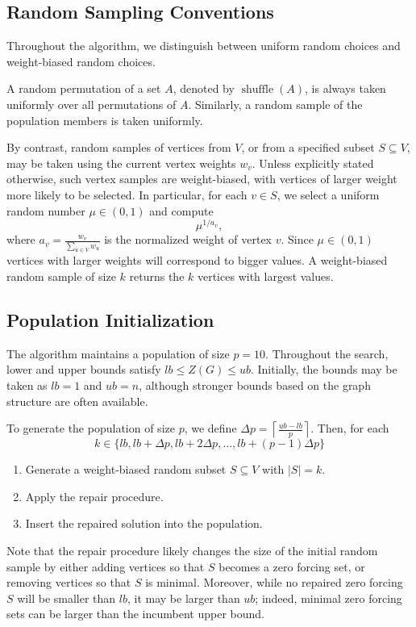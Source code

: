 \documentclass[11pt]{article}
\newcommand\ceil[1]{\left\lceil #1\right\rceil}
\newcommand\shuffle[1]{\operatorname{shuffle}\left(#1\right)}
\begin{document}
\subsection{Random Sampling Conventions}
Throughout the algorithm, we distinguish between uniform random choices and weight-biased random choices.

A random permutation of a set $A$, denoted by $\shuffle{A}$, is always taken uniformly over all permutations of $A$.
Similarly, a random sample of the population members is taken uniformly. 

By contrast, random samples of vertices from $V$, or from a specified subset $S\subseteq V$, may be taken using the current vertex weights $w_v$.
Unless explicitly stated otherwise, such vertex samples are weight-biased, with vertices of larger weight more likely to be selected.
In particular, for each $v\in S$, we select a uniform random number $\mu\in(0,1)$ and compute
\[
\mu^{1/a_{v}},
\]
where $a_{v}=\frac{w_{v}}{\sum_{u\in V}w_{u}}$ is the normalized weight of vertex $v$. 
Since $\mu\in(0,1)$ vertices with larger weights will correspond to bigger values.
A weight-biased random sample of size $k$ returns the $k$ vertices with largest values. 

\subsection{Population Initialization}
The algorithm maintains a population of size $p=10$.
Throughout the search, lower and upper bounds satisfy $lb \le Z(G) \le ub$.
Initially, the bounds may be taken as $lb=1$ and $ub=n$, although stronger bounds based on the graph structure are often available. 

To generate the population of size $p$, we define $\Delta p=\ceil{\frac{ub-lb}{p}}$.
Then, for each 
\[
k\in\{lb,lb+\Delta p,lb+2\Delta p,\ldots,lb+(p-1)\Delta p\}
\]
\begin{enumerate}
\item Generate a weight-biased random subset $S \subseteq V$ with
$|S|=k$.

\item Apply the repair procedure.

\item Insert the repaired solution into the population.
\end{enumerate}
Note that the repair procedure likely changes the size of the initial random sample by either adding vertices so that $S$ becomes a zero forcing set, or removing vertices so that $S$ is minimal.
Moreover, while no repaired zero forcing $S$ will be smaller than $lb$, it may be larger than $ub$; indeed, minimal zero forcing sets can be larger than the incumbent upper bound. 
\end{document}
